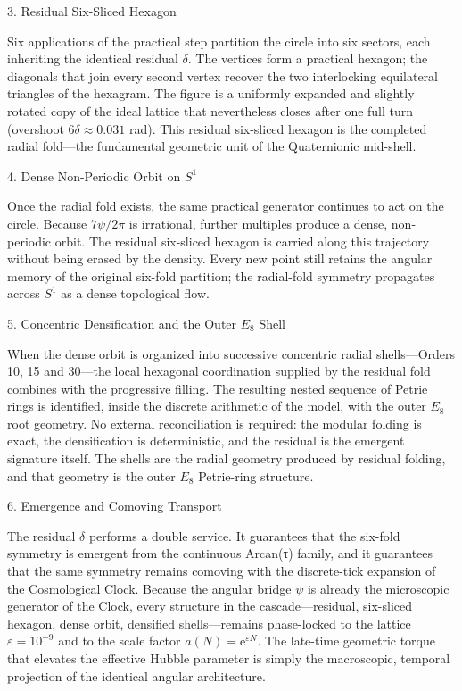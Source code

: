 3. Residual Six-Sliced Hexagon

Six applications of the practical step partition the circle into six sectors, each inheriting the identical residual \(\delta\). The vertices form a practical hexagon; the diagonals that join every second vertex recover the two interlocking equilateral triangles of the hexagram. The figure is a uniformly expanded and slightly rotated copy of the ideal lattice that nevertheless closes after one full turn (overshoot \(6\delta\approx0.031\) rad). This residual six-sliced hexagon is the completed radial fold—the fundamental geometric unit of the Quaternionic mid-shell.

4. Dense Non-Periodic Orbit on \(S^1\)

Once the radial fold exists, the same practical generator continues to act on the circle. Because \(7\psi/2\pi\) is irrational, further multiples produce a dense, non-periodic orbit. The residual six-sliced hexagon is carried along this trajectory without being erased by the density. Every new point still retains the angular memory of the original six-fold partition; the radial-fold symmetry propagates across \(S^1\) as a dense topological flow.

5. Concentric Densification and the Outer \(E_8\) Shell

When the dense orbit is organized into successive concentric radial shells—Orders 10, 15 and 30—the local hexagonal coordination supplied by the residual fold combines with the progressive filling. The resulting nested sequence of Petrie rings is identified, inside the discrete arithmetic of the model, with the outer \(E_8\) root geometry. No external reconciliation is required: the modular folding is exact, the densification is deterministic, and the residual is the emergent signature itself. The shells are the radial geometry produced by residual folding, and that geometry is the outer \(E_8\) Petrie-ring structure.

6. Emergence and Comoving Transport

The residual \(\delta\) performs a double service. It guarantees that the six-fold symmetry is emergent from the continuous Arcan(τ) family, and it guarantees that the same symmetry remains comoving with the discrete-tick expansion of the Cosmological Clock. Because the angular bridge \(\psi\) is already the microscopic generator of the Clock, every structure in the cascade—residual, six-sliced hexagon, dense orbit, densified shells—remains phase-locked to the lattice \(\varepsilon=10^{-9}\) and to the scale factor \(a(N)=\mathrm{e}^{\varepsilon N}\). The late-time geometric torque that elevates the effective Hubble parameter is simply the macroscopic, temporal projection of the identical angular architecture.

